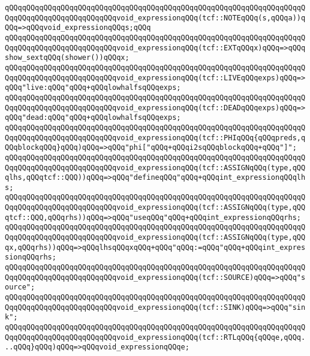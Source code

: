 \verb|qQQqqQQqqQQqqQQqqQQqqQQqqQQqqQQqqQQqqQQqqQQqqQQqqQQqqQQqqQQqqQQqqQQqqQQqqQQqqQQqqQQqqQQqqQQqqQQqvoid_expressionqQQq(tcf::NOTEqQQq(s,qQQqa))qQQq=>qQQqvoid_expressionqQQqs;qQQq|\newline
\verb|qQQqqQQqqQQqqQQqqQQqqQQqqQQqqQQqqQQqqQQqqQQqqQQqqQQqqQQqqQQqqQQqqQQqqQQqqQQqqQQqqQQqqQQqqQQqqQQqvoid_expressionqQQq(tcf::EXTqQQqx)qQQq=>qQQqshow_sextqQQq(shower())qQQqx;|\newline
\verb|qQQqqQQqqQQqqQQqqQQqqQQqqQQqqQQqqQQqqQQqqQQqqQQqqQQqqQQqqQQqqQQqqQQqqQQqqQQqqQQqqQQqqQQqqQQqqQQqvoid_expressionqQQq(tcf::LIVEqQQqexps)qQQq=>qQQq"live:qQQq"qQQq+qQQqlowhalfsqQQqexps;|\newline
\verb|qQQqqQQqqQQqqQQqqQQqqQQqqQQqqQQqqQQqqQQqqQQqqQQqqQQqqQQqqQQqqQQqqQQqqQQqqQQqqQQqqQQqqQQqqQQqqQQqvoid_expressionqQQq(tcf::DEADqQQqexps)qQQq=>qQQq"dead:qQQq"qQQq+qQQqlowhalfsqQQqexps;|\newline
\verb|qQQqqQQqqQQqqQQqqQQqqQQqqQQqqQQqqQQqqQQqqQQqqQQqqQQqqQQqqQQqqQQqqQQqqQQqqQQqqQQqqQQqqQQqqQQqqQQqvoid_expressionqQQq(tcf::PHIqQQq{qQQqpreds,qQQqblockqQQq}qQQq)qQQq=>qQQq"phi["qQQq+qQQqi2sqQQqblockqQQq+qQQq"]";|\newline
\verb|qQQqqQQqqQQqqQQqqQQqqQQqqQQqqQQqqQQqqQQqqQQqqQQqqQQqqQQqqQQqqQQqqQQqqQQqqQQqqQQqqQQqqQQqqQQqqQQqvoid_expressionqQQq(tcf::ASSIGNqQQq(type,qQQqlhs,qQQqtcf::QQQ))qQQq=>qQQq"defineqQQq"qQQq+qQQqint_expressionqQQqlhs;|\newline
\verb|qQQqqQQqqQQqqQQqqQQqqQQqqQQqqQQqqQQqqQQqqQQqqQQqqQQqqQQqqQQqqQQqqQQqqQQqqQQqqQQqqQQqqQQqqQQqqQQqvoid_expressionqQQq(tcf::ASSIGNqQQq(type,qQQqtcf::QQQ,qQQqrhs))qQQq=>qQQq"useqQQq"qQQq+qQQqint_expressionqQQqrhs;|\newline
\verb|qQQqqQQqqQQqqQQqqQQqqQQqqQQqqQQqqQQqqQQqqQQqqQQqqQQqqQQqqQQqqQQqqQQqqQQqqQQqqQQqqQQqqQQqqQQqqQQqvoid_expressionqQQq(tcf::ASSIGNqQQq(type,qQQqx,qQQqrhs))qQQq=>qQQqlhsqQQqxqQQq+qQQq"qQQq:=qQQq"qQQq+qQQqint_expressionqQQqrhs;|\newline
\verb|qQQqqQQqqQQqqQQqqQQqqQQqqQQqqQQqqQQqqQQqqQQqqQQqqQQqqQQqqQQqqQQqqQQqqQQqqQQqqQQqqQQqqQQqqQQqqQQqvoid_expressionqQQq(tcf::SOURCE)qQQq=>qQQq"source";|\newline
\verb|qQQqqQQqqQQqqQQqqQQqqQQqqQQqqQQqqQQqqQQqqQQqqQQqqQQqqQQqqQQqqQQqqQQqqQQqqQQqqQQqqQQqqQQqqQQqqQQqvoid_expressionqQQq(tcf::SINK)qQQq=>qQQq"sink";|\newline
\verb|qQQqqQQqqQQqqQQqqQQqqQQqqQQqqQQqqQQqqQQqqQQqqQQqqQQqqQQqqQQqqQQqqQQqqQQqqQQqqQQqqQQqqQQqqQQqqQQqvoid_expressionqQQq(tcf::RTLqQQq{qQQqe,qQQq...qQQq}qQQq)qQQq=>qQQqvoid_expressionqQQqe;|\newline
